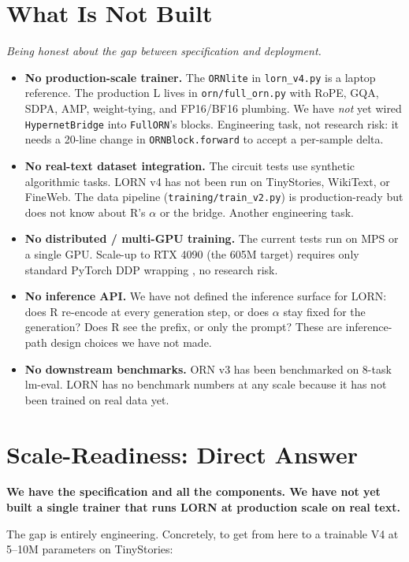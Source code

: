 \documentclass[10pt, twocolumn, a4paper]{article}
\begin{document}
\section{What Is Not Built}

\emph{Being honest about the gap between specification and deployment.}

\begin{itemize}[nosep,leftmargin=*]
\item \textbf{No production-scale trainer.} The \texttt{ORNlite} in \texttt{lorn\_v4.py} is a laptop reference. The production L lives in \texttt{orn/full\_orn.py} with RoPE, GQA, SDPA, AMP, weight-tying, and FP16/BF16 plumbing. We have \emph{not} yet wired \texttt{HypernetBridge} into \texttt{FullORN}'s blocks. Engineering task, not research risk: it needs a 20-line change in \texttt{ORNBlock.forward} to accept a per-sample delta.
\item \textbf{No real-text dataset integration.} The circuit tests use synthetic algorithmic tasks. LORN v4 has not been run on TinyStories, WikiText, or FineWeb. The data pipeline (\texttt{training/train\_v2.py}) is production-ready but does not know about R's $\alpha$ or the bridge. Another engineering task.
\item \textbf{No distributed / multi-GPU training.} The current tests run on MPS or a single GPU. Scale-up to RTX 4090 (the 605M target) requires only standard PyTorch DDP wrapping ,  no research risk.
\item \textbf{No inference API.} We have not defined the inference surface for LORN: does R re-encode at every generation step, or does $\alpha$ stay fixed for the generation? Does R see the prefix, or only the prompt? These are inference-path design choices we have not made.
\item \textbf{No downstream benchmarks.} ORN v3 has been benchmarked on 8-task lm-eval. LORN has no benchmark numbers at any scale because it has not been trained on real data yet.
\end{itemize}

\section{Scale-Readiness: Direct Answer}

\textbf{We have the specification and all the components. We have not yet built a single trainer that runs LORN at production scale on real text.}

The gap is entirely engineering. Concretely, to get from here to a trainable V4 at 5--10M parameters on TinyStories:
\end{document}
